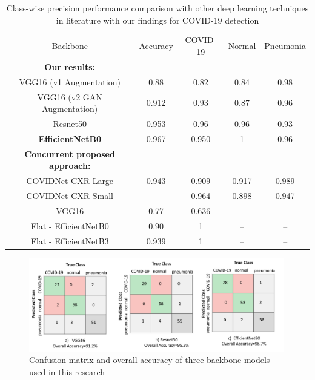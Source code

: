 \begin{table}{
     \centering
    \caption{Class-wise precision performance comparison with other deep learning techniques in literature with our findings for COVID-19 detection}   \label{table:performance_comparison}
  \begin{tabularx}{0.99\textwidth}{c c |c c c }
    \toprule
    Backbone & Accuracy & COVID-19& Normal  &Pneumonia\\
    \otoprule

    
     \bf{Our results:} &&&& \\
     VGG16 (v1 Augmentation)&0.88&0.82&0.84 & 0.98\\
    VGG16 (v2 GAN Augmentation) &0.912 &0.93&0.87&0.96\\
    Resnet50&0.953&0.96& 0.96& 0.93 \\
 \bf{ EfficientNetB0} &0.967 &0.950&1&0.96 \\
     
 \hline
   
    \bf{Concurrent proposed approach:} &&&& \\
        COVIDNet-CXR Large \cite{wang2020covid}&0.943&0.909&0.917&0.989 \\
        COVIDNet-CXR Small \cite{wang2020covid}&--&0.964&0.898&0.947  \\  
    
  VGG16  \cite{luz2020efficient}&0.77&0.636&--&--\\
     Flat - EfficientNetB0 \cite{luz2020efficient}&0.90&1&--&--\\
     Flat - EfficientNetB3 \cite{luz2020efficient}&0.939&1&--&--\\
 
    \bottomrule
  \end{tabularx}}
\end{table}

\begin{figure}
\centering
\includegraphics[width=0.99\textwidth]{images/CM_3 models.png}
   \caption{Confusion matrix and overall accuracy of three backbone models used in this research}
\label{fig:confusionmatrix}
\end{figure}




